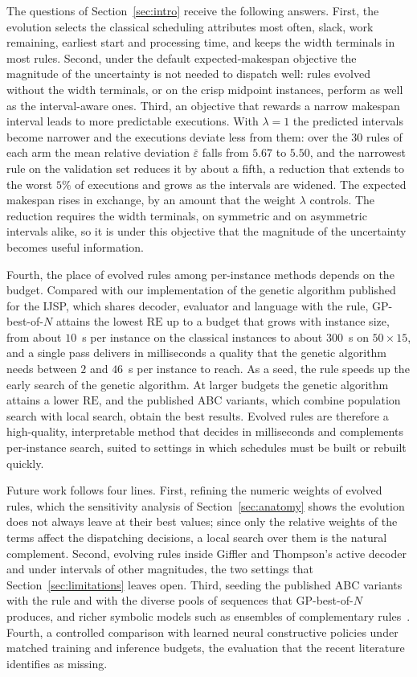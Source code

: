 \documentclass[preprint,number,sort&compress,12pt]{elsarticle}
\newcommand{\RE}{\mathrm{RE}}
\begin{document}
The questions of Section~\ref{sec:intro} receive the following answers.
First, the evolution selects the classical scheduling attributes most
often, slack, work remaining, earliest start and processing time, and
keeps the width terminals in most rules. Second, under the default
expected-makespan objective the magnitude of the uncertainty is not
needed to dispatch well: rules evolved without the width terminals, or
on the crisp midpoint instances, perform as well as the interval-aware
ones. Third, an objective that rewards a narrow makespan interval leads to
more predictable executions. With $\lambda = 1$ the predicted intervals
become narrower and the executions deviate less from them: over the 30
rules of each arm the mean relative deviation $\bar\varepsilon$ falls
from $5.67$ to $5.50$, and the narrowest rule on the validation set
reduces it by about a fifth, a reduction that extends to the worst $5\%$
of executions and grows as the intervals are widened. The expected makespan rises in exchange, by an
amount that the weight $\lambda$ controls. The reduction requires the
width terminals, on symmetric and on asymmetric intervals alike, so it
is under this objective that the magnitude of the uncertainty becomes
useful information.

Fourth, the place of evolved rules among per-instance methods depends on
the budget. Compared with our implementation of the genetic algorithm
published for the IJSP, which shares decoder, evaluator and language
with the rule, GP-best-of-$N$ attains the lowest $\RE$ up to a budget
that grows with instance size, from about $10$~s per instance on the
classical instances to about $300$~s on $50{\times}15$, and a single
pass delivers in milliseconds a quality that the genetic algorithm needs
between $2$ and $46$~s per instance to reach. As a seed, the rule speeds
up the early search of the genetic algorithm. At larger budgets the
genetic algorithm attains a lower $\RE$, and the published ABC variants,
which combine population search with local search, obtain the best
results. Evolved rules are therefore a high-quality, interpretable
method that decides in milliseconds and complements per-instance search,
suited to settings in which schedules must be built or rebuilt quickly.

Future work follows four lines. First, refining the numeric weights of
evolved rules, which the sensitivity analysis of
Section~\ref{sec:anatomy} shows the evolution does not always leave at
their best values; since only the relative weights of the terms affect
the dispatching decisions, a local search over them is the natural
complement.
Second, evolving rules inside Giffler and Thompson's active decoder and
under intervals of other magnitudes, the two settings that
Section~\ref{sec:limitations} leaves open. Third, seeding the published
ABC variants with the rule and with the diverse pools of sequences that
GP-best-of-$N$ produces, and richer symbolic models such as ensembles of
complementary rules~\citep{GilGala2021Ensembles}. Fourth, a controlled
comparison with learned neural constructive policies under matched
training and inference budgets, the evaluation that the recent
literature~\citep{Xu2025} identifies as missing.
\end{document}

